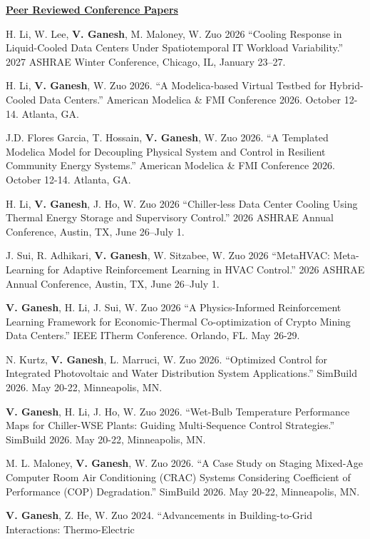 \documentclass[]{Keval-resume}
\begin{document}
{{\textbf{\underline{Peer Reviewed Conference Papers}}

\begin{etaremune}
\setlength{\itemsep}{0pt}
    \setlength{\parsep}{0pt}
\item H. Li, W. Lee, \textbf{V. Ganesh}, M. Maloney, W. Zuo 2026 “Cooling Response in Liquid-Cooled Data Centers Under Spatiotemporal IT Workload Variability.” 2027 ASHRAE Winter Conference, Chicago, IL, January 23--27.
\item H. Li, \textbf{V. Ganesh}, W. Zuo 2026. “A Modelica-based Virtual Testbed for Hybrid-Cooled Data Centers.” American Modelica \& FMI Conference 2026. October 12-14. Atlanta, GA.
\item J.D. Flores Garcia, T. Hossain, \textbf{V. Ganesh}, W. Zuo 2026. “A Templated Modelica Model for Decoupling Physical System and Control in Resilient Community Energy Systems.” American Modelica \& FMI Conference 2026. October 12-14. Atlanta, GA.
\item H. Li, \textbf{V. Ganesh}, J. Ho, W. Zuo 2026 “Chiller-less Data Center Cooling Using Thermal Energy Storage and Supervisory Control.” 2026 ASHRAE Annual Conference, Austin, TX, June 26--July 1.
\item J. Sui, R. Adhikari, \textbf{V. Ganesh}, W. Sitzabee, W. Zuo 2026 “MetaHVAC: Meta-Learning for Adaptive Reinforcement Learning in HVAC Control.” 2026 ASHRAE Annual Conference, Austin, TX, June 26--July 1.
\item \textbf{V. Ganesh}, H. Li, J. Sui, W. Zuo 2026 “A Physics-Informed Reinforcement Learning Framework for
Economic-Thermal Co-optimization of Crypto Mining Data Centers.” IEEE ITherm Conference. Orlando, FL. May 26-29.
\item N. Kurtz, \textbf{V. Ganesh}, L. Marruci, W. Zuo 2026. “Optimized Control for Integrated Photovoltaic and Water
Distribution System Applications.” SimBuild 2026. May 20-22, Minneapolis, MN.
\item \textbf{V. Ganesh}, H. Li, J. Ho, W. Zuo 2026. “Wet-Bulb Temperature Performance Maps for Chiller-WSE
Plants: Guiding Multi-Sequence Control Strategies.” SimBuild 2026. May 20-22, Minneapolis, MN.
\item M. L. Maloney, \textbf{V. Ganesh}, W. Zuo 2026. “A Case Study on Staging Mixed-Age Computer Room Air
Conditioning (CRAC) Systems Considering Coefficient of Performance (COP) Degradation.” SimBuild
2026. May 20-22, Minneapolis, MN.
\item \textbf{V. Ganesh}, Z. He, W. Zuo 2024.
“Advancements in Building-to-Grid Interactions: Thermo-Electric

\end{etaremune}}}
\end{document}

